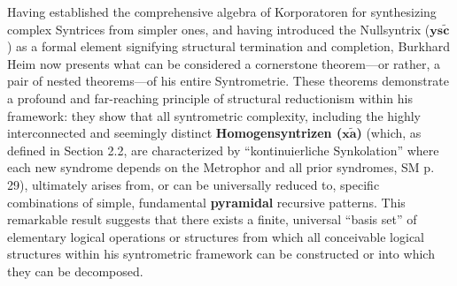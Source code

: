 \documentclass[12pt]{article}
\newcommand{\q}[1]{\enquote{#1}}
\newcommand{\homogeneoussyntrix}{\bm{x\widetilde{a}}}
\newcommand{\nullsyntrix}{\bm{ys\widetilde{c}}}
\begin{document}
Having established the comprehensive algebra of Korporatoren for synthesizing complex Syntrices from simpler ones, and having introduced the Nullsyntrix (\( \nullsyntrix \)) as a formal element signifying structural termination and completion, Burkhard Heim now presents what can be considered a cornerstone theorem—or rather, a pair of nested theorems—of his entire Syntrometrie. These theorems demonstrate a profound and far-reaching principle of structural reductionism within his framework: they show that all syntrometric complexity, including the highly interconnected and seemingly distinct \textbf{Homogensyntrizen (\( \homogeneoussyntrix \))} (which, as defined in Section 2.2, are characterized by \q{kontinuierliche Synkolation} where each new syndrome depends on the Metrophor and all prior syndromes, SM p. 29), ultimately arises from, or can be universally reduced to, specific combinations of simple, fundamental \textbf{pyramidal} recursive patterns. This remarkable result suggests that there exists a finite, universal \q{basis set} of elementary logical operations or structures from which all conceivable logical structures within his syntrometric framework can be constructed or into which they can be decomposed.
\end{document}

